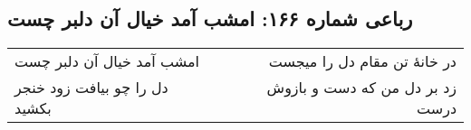 \begin{center}
\section*{رباعی شماره ۱۶۶: امشب آمد خیال آن دلبر چست}
\label{sec:0166}
\begin{longtable}{l p{0.5cm} r}
امشب آمد خیال آن دلبر چست
&&
در خانهٔ تن مقام دل را میجست
\\
دل را چو بیافت زود خنجر بکشید
&&
زد بر دل من که دست و بازوش درست
\\
\end{longtable}
\end{center}

